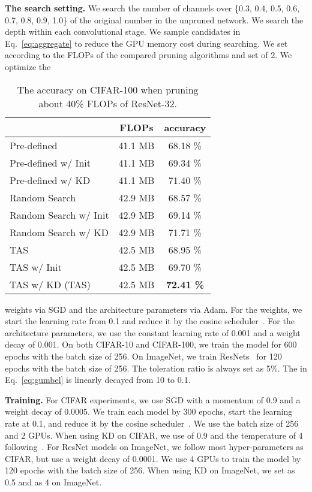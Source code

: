 \documentclass{article}
\def\Eqref#1{Eq.~\eqref{#1}}
\def\NAME{{TAS}}
\begin{document}
\textbf{The search setting.}
We search the number of channels over \{0.3, 0.4, 0.5, 0.6, 0.7, 0.8, 0.9, 1.0\} of the original number in the unpruned network. We search the depth within each convolutional stage.
We sample  candidates in \Eqref{eq:aggregate} to reduce the GPU memory cost during searching.
We set  according to the FLOPs of the compared pruning algorithms and set  of 2.
We optimize the
\begin{wraptable}{r}{65mm}
\vspace{-3mm}
\caption{
The accuracy on CIFAR-100 when pruning about 40\% FLOPs of ResNet-32.}
\setlength{\tabcolsep}{3pt}
\begin{tabular}{l|c|c}
\hline
                          & FLOPs   & accuracy \\ \hline
Pre-defined               & 41.1 MB & 68.18 \% \\
Pre-defined w/ Init       & 41.1 MB & 69.34 \% \\
Pre-defined w/ KD         & 41.1 MB & 71.40 \% \\ \hline
Random Search             & 42.9 MB & 68.57 \% \\
Random Search w/ Init     & 42.9 MB & 69.14 \% \\
Random Search w/ KD       & 42.9 MB & 71.71 \% \\ \hline
{\NAME}          & 42.5 MB & 68.95 \% \\
{\NAME} w/ Init  & 42.5 MB & 69.70 \% \\
{\NAME} w/ KD ({\NAME}) & 42.5 MB & \textbf{72.41 \%} \\ 
\hline
\end{tabular}
\vspace{-4mm}
\label{table:alo-setting}
\end{wraptable}
weights via SGD and the architecture parameters via Adam.
For the weights, we start the learning rate from 0.1 and reduce it by the cosine scheduler~\cite{loshchilov2017sgdr}. For the architecture parameters, we use the constant learning rate of 0.001 and a weight decay of 0.001. On both CIFAR-10 and CIFAR-100, we train the model for 600 epochs with the batch size of 256.
On ImageNet, we train ResNets~\cite{he2016deep} for 120 epochs with the batch size of 256.
The toleration ratio  is always set as 5\%.
The  in \Eqref{eq:gumbel} is linearly decayed from 10 to 0.1.





\textbf{Training.} For CIFAR experiments, we use SGD with a momentum of 0.9 and a weight decay of 0.0005. We train each model by 300 epochs, start the learning rate at 0.1, and reduce it by the cosine scheduler~\cite{loshchilov2017sgdr}. We use the batch size of 256 and 2 GPUs.
When using KD on CIFAR, we use  of 0.9 and the temperature  of 4 following~\cite{zagoruyko2017paying}.
For ResNet models on ImageNet, we follow most hyper-parameters as CIFAR, but use a weight decay of 0.0001. We use 4 GPUs to train the model by 120 epochs with the batch size of 256.
When using KD on ImageNet, we set  as 0.5 and  as 4 on ImageNet.
\end{document}
